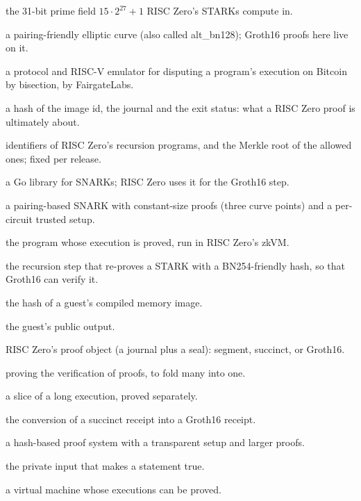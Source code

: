 \documentclass[11pt]{article}
\begin{document}
\begin{description}[leftmargin=1.5em, style=nextline]
\item[BabyBear] the 31-bit prime field $15\cdot 2^{27}+1$ RISC Zero's
  STARKs compute in.
\item[BN254] a pairing-friendly elliptic curve (also called alt\_bn128);
  Groth16 proofs here live on it.
\item[BitVMX] a protocol and RISC-V emulator for disputing a program's
  execution on Bitcoin by bisection, by FairgateLabs.
\item[claim digest] a hash of the image id, the journal and the exit
  status: what a RISC Zero proof is ultimately about.
\item[control id, control root] identifiers of RISC Zero's recursion
  programs, and the Merkle root of the allowed ones; fixed per release.
\item[gnark] a Go library for SNARKs; RISC Zero uses it for the Groth16
  step.
\item[Groth16] a pairing-based SNARK with constant-size proofs (three
  curve points) and a per-circuit trusted setup.
\item[guest] the program whose execution is proved, run in RISC Zero's
  zkVM.
\item[identity\_p254] the recursion step that re-proves a STARK with a
  BN254-friendly hash, so that Groth16 can verify it.
\item[image id] the hash of a guest's compiled memory image.
\item[journal] the guest's public output.
\item[receipt] RISC Zero's proof object (a journal plus a seal): segment,
  succinct, or Groth16.
\item[recursion] proving the verification of proofs, to fold many into
  one.
\item[segment] a slice of a long execution, proved separately.
\item[shrink-wrap] the conversion of a succinct receipt into a Groth16
  receipt.
\item[STARK] a hash-based proof system with a transparent setup and
  larger proofs.
\item[witness] the private input that makes a statement true.
\item[zkVM] a virtual machine whose executions can be proved.
\end{description}
\end{document}

